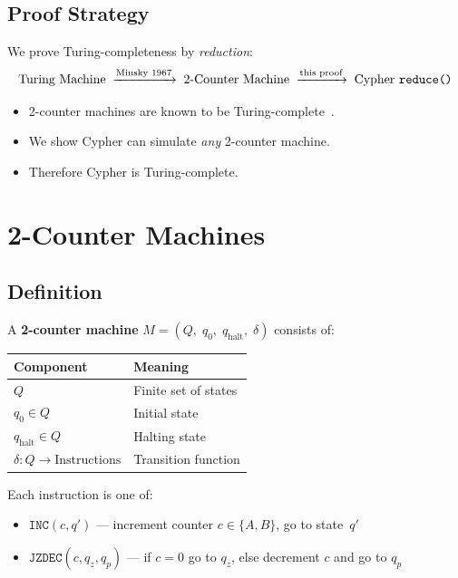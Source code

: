 \documentclass[11pt,a4paper]{article}
\begin{document}
\subsection{Proof Strategy}

We prove Turing-completeness by \emph{reduction}:
%
\[
  \text{Turing Machine}
  \;\xrightarrow{\text{Minsky 1967}}\;
  \text{2-Counter Machine}
  \;\xrightarrow{\text{this proof}}\;
  \text{Cypher \texttt{reduce()}}
\]
%
\begin{itemize}[leftmargin=1.5em]
  \item 2-counter machines are known to be Turing-complete~\cite{minsky1967}.
  \item We show Cypher can simulate \emph{any} 2-counter machine.
  \item Therefore Cypher is Turing-complete.
\end{itemize}


\section{2-Counter Machines}

\subsection{Definition}

A \textbf{2-counter machine} $M = (Q,\; q_0,\; q_{\text{halt}},\; \delta)$ consists of:

\begin{center}
\begin{tabular}{@{}ll@{}}
\toprule
\textbf{Component} & \textbf{Meaning} \\
\midrule
$Q$ & Finite set of states \\
$q_0 \in Q$ & Initial state \\
$q_{\text{halt}} \in Q$ & Halting state \\
$\delta : Q \to \text{Instructions}$ & Transition function \\
\bottomrule
\end{tabular}
\end{center}

\noindent Each instruction is one of:
\begin{itemize}[leftmargin=1.5em]
  \item $\texttt{INC}(c, q')$ --- increment counter $c \in \{A, B\}$, go to state~$q'$
  \item $\texttt{JZDEC}(c, q_z, q_p)$ --- if $c = 0$ go to $q_z$, else decrement $c$ and go to $q_p$
\end{itemize}
\end{document}
